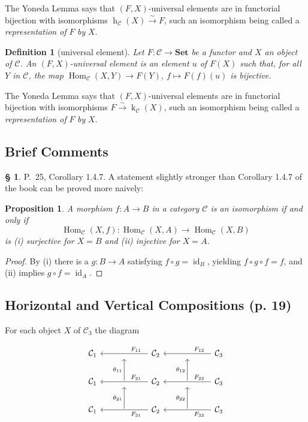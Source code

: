 \documentclass[12pt]{article}
\newtheorem{prop}[thm]{Proposition}
\newtheorem{df}[thm]{Definition}
\theoremstyle{remark}
\theoremstyle{definition}
\newtheorem{s}[thm]{\S}
\newcommand{\C}{\mathcal C}
\newcommand{\Set}{\mathbf{Set}}
\newcommand{\xr}{\xrightarrow}
\DeclareMathOperator{\hy}{h}
\DeclareMathOperator{\ky}{k}
\DeclareMathOperator{\id}{id}
\DeclareMathOperator{\Hom}{Hom}
\begin{document}
The Yoneda Lemma says that $(F,X)$\--universal elements are in functorial bijection with isomorphisms $\hy_\C(X)\xr\sim F$, such an isomorphism being called a {\em representation of} $F$ {\em by} $X$.

\begin{df}[universal element]\label{ue2} 
Let $F:\C\to\Set$ be a functor and $X$ an object of $\C$. An $(F,X)$\--{\em universal element} is an element $u$ of $F(X)$ such that, for all $Y$ in $\C$, the map $\Hom_\C(X,Y)\to F(Y),\ f\mapsto F(f)(u)$ is bijective. 
\end{df}

The Yoneda Lemma says that $(F,X)$\--universal elements are in functorial bijection with isomorphisms $F\xr\sim\ky_\C(X)$, such an isomorphism being called a {\em representation of} $F$ {\em by} $X$.


\subsection{Brief Comments}

\begin{s} 
P.~25, Corollary 1.4.7. A statement slightly stronger than Corollary 1.4.7 of the book can be proved more naively:

\begin{prop}\label{yp}
A morphism $f:A\to B$ in a category $\C$ is an isomorphism if and only if 
$$
\Hom_\C(X,f):\Hom_\C(X,A)\to\Hom_\C(X,B)
$$
is (i) surjective for $X=B$ and (ii) injective for $X=A$.
\end{prop}

\begin{proof} By (i) there is a $g:B\to A$ satisfying $f\circ g=\id_B$, yielding $f\circ g\circ f=f$, and (ii) implies $g\circ f=\id_A$.
\end{proof}
\end{s}


\subsection{Horizontal and Vertical Compositions (p. 19)}\label{hove1}

For each object $X$ of $\C_3$ the diagram 

$$
\begin{tikzcd}
%
\C_1&{}&\C_2\ar{ll}{}[near start,swap]{F_{11}}&{}&\C_3\ar{ll}{}[near start,swap]{F_{12}}\\ 
%
\C_1&\ar{u}{\theta_{11}}&\C_2\ar{ll}{}[near start,swap]{F_{21}}&\ar{u}{\theta_{12}}&\C_3\ar{ll}{}[near start,swap]{F_{22}}\\ 
%
\C_1&\ar{u}{\theta_{21}}&\C_2\ar{ll}{}[near start]{F_{31}}&\ar{u}{\theta_{22}}&\C_3\ar{ll}{}[near start]{F_{32}}
%
\end{tikzcd}
$$ 
\end{document}
